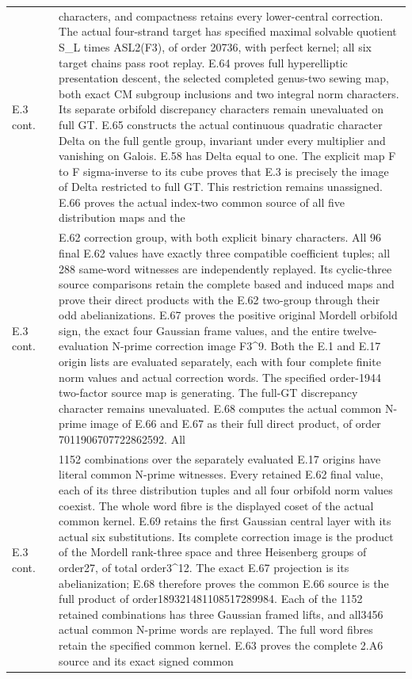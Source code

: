 \begin{longtable}{@{}p{1.1cm}p{3.0cm}p{10.3cm}@{}}
E.3 cont. &  & characters, and compactness retains every lower-central correction. The actual four-strand target has specified maximal solvable quotient S\_L times ASL2(F3), of order 20736, with perfect kernel; all six target chains pass root replay. E.64 proves full hyperelliptic presentation descent, the selected completed genus-two sewing map, both exact CM subgroup inclusions and two integral norm characters. Its separate orbifold discrepancy characters remain unevaluated on full GT. E.65 constructs the actual continuous quadratic character Delta on the full gentle group, invariant under every multiplier and vanishing on Galois. E.58 has Delta equal to one. The explicit map F to F sigma-inverse to its cube proves that E.3 is precisely the image of Delta restricted to full GT. This restriction remains unassigned. E.66 proves the actual index-two common source of all five distribution maps and the  \\
E.3 cont. &  & E.62 correction group, with both explicit binary characters. All 96 final E.62 values have exactly three compatible coefficient tuples; all 288 same-word witnesses are independently replayed. Its cyclic-three source comparisons retain the complete based and induced maps and prove their direct products with the E.62 two-group through their odd abelianizations. E.67 proves the positive original Mordell orbifold sign, the exact four Gaussian frame values, and the entire twelve-evaluation N-prime correction image F3\textasciicircum{}9. Both the E.1 and E.17 origin lists are evaluated separately, each with four complete finite norm values and actual correction words. The specified order-1944 two-factor source map is generating. The full-GT discrepancy character remains unevaluated. E.68 computes the actual common N-prime image of E.66 and E.67 as their full direct product, of order 7011906707722862592. All  \\
E.3 cont. &  & 1152 combinations over the separately evaluated E.17 origins have literal common N-prime witnesses. Every retained E.62 final value, each of its three distribution tuples and all four orbifold norm values coexist. The whole word fibre is the displayed coset of the actual common kernel. E.69 retains the first Gaussian central layer with its actual six substitutions. Its complete correction image is the product of the Mordell rank-three space and three Heisenberg groups of order27, of total order3\textasciicircum{}12. The exact E.67 projection is its abelianization; E.68 therefore proves the common E.66 source is the full product of order189321481108517289984. Each of the 1152 retained combinations has three Gaussian framed lifts, and all3456 actual common N-prime words are replayed. The full word fibres retain the specified common kernel. E.63 proves the complete 2.A6 source and its exact signed common  \\

\end{longtable}
